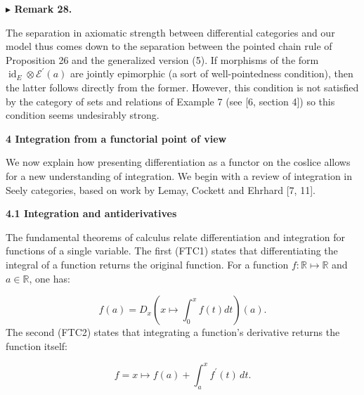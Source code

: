 \documentclass[10pt,a4paper]{article}
\begin{document}
\par\medskip\noindent\textbf{$\blacktriangleright$ Remark 28.}\par
 
 
The separation in axiomatic strength between differential categories and our model thus comes down to the separation between the pointed chain rule of Proposition 26 and the generalized version (5). If morphisms of the form $\operatorname{id}_{E}\otimes\mathcal{E}^{\prime}(a)$ are jointly epimorphic (a sort of well-pointedness condition), then the latter follows directly from the former. However, this condition is not satisfied by the category of sets and relations of Example 7 (see [6, section 4]) so this condition seems undesirably strong.\par
 
 
 

 


 
\par\medskip\noindent\textbf{4 Integration from a functorial point of view}\par
 
 
We now explain how presenting differentiation as a functor on the coslice allows for a new understanding of integration. We begin with a review of integration in Seely categories, based on work by Lemay, Cockett and Ehrhard [7, 11].\par
 
 
 
\par\medskip\noindent\textbf{4.1 Integration and antiderivatives}\par
 
 
The fundamental theorems of calculus relate differentiation and integration for functions of a single variable. The first (FTC1) states that differentiating the integral of a function returns the original function. For a function $f:\mathbb{R}\mapsto\mathbb{R}$ and $a\in\mathbb{R}$, one has:\par
    \[f(a)=D_{x}\left(x\mapsto\int_{0}^{x}f(t)dt\right)(a).\]    
The second (FTC2) states that integrating a function’s derivative returns the function itself:\par
    \[f=x\mapsto f(a)+\int_{a}^{x}f^{\prime}(t)\,dt.\]    
 
\end{document}
